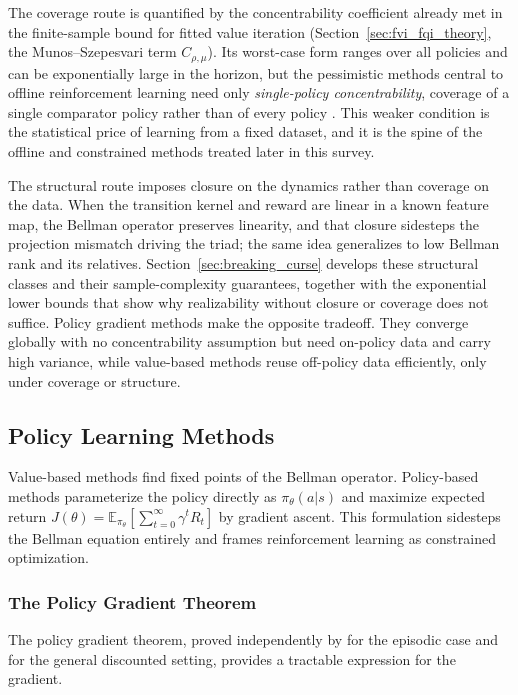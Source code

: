 The coverage route is quantified by the concentrability coefficient already met in the finite-sample bound for fitted value iteration (Section~\ref{sec:fvi_fqi_theory}, the Munos--Szepesvari term $C_{\rho,\mu}$). Its worst-case form ranges over all policies and can be exponentially large in the horizon, but the pessimistic methods central to offline reinforcement learning need only \emph{single-policy concentrability}, coverage of a single comparator policy rather than of every policy \citep{Rashidinejad2021}. This weaker condition is the statistical price of learning from a fixed dataset, and it is the spine of the offline and constrained methods treated later in this survey.

The structural route imposes closure on the dynamics rather than coverage on the data. When the transition kernel and reward are linear in a known feature map, the Bellman operator preserves linearity, and that closure sidesteps the projection mismatch driving the triad; the same idea generalizes to low Bellman rank and its relatives. Section~\ref{sec:breaking_curse} develops these structural classes and their sample-complexity guarantees, together with the exponential lower bounds that show why realizability without closure or coverage does not suffice. Policy gradient methods make the opposite tradeoff. They converge globally with no concentrability assumption \citep[Theorem~5.3]{agarwal2021theory} but need on-policy data and carry high variance, while value-based methods reuse off-policy data efficiently, only under coverage or structure.


\subsection{Policy Learning Methods}
\label{sec:policy_gradient}

Value-based methods find fixed points of the Bellman operator. Policy-based methods parameterize the policy directly as $\pi_\theta(a|s)$ and maximize expected return $J(\theta) = \mathbb{E}_{\pi_\theta}[\sum_{t=0}^\infty \gamma^t R_t]$ by gradient ascent. This formulation sidesteps the Bellman equation entirely and frames reinforcement learning as constrained optimization.

\subsubsection{The Policy Gradient Theorem}

The policy gradient theorem, proved independently by \citet{williams1992} for the episodic case and \citet{SuttonMcAllester2000} for the general discounted setting, provides a tractable expression for the gradient.

